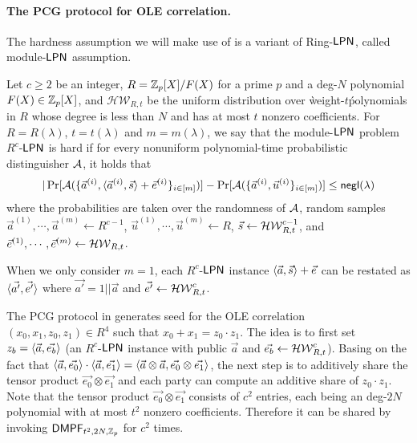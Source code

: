 \paragraph{The PCG protocol for OLE correlation.}The hardness assumption we will make use of is a variant of Ring-${\sf LPN}$, called module-${\sf LPN}$ assumption. 
\begin{definition}\label{def:module-LPN}
    Let $c\ge 2$ be an integer, $R = \mathbb{Z}_p[X]/F(X)$ for a prime $p$ and a deg-$N$ polynomial $F(X)\in \mathbb{Z}_p[X]$, and $\mathcal{HW}_{R,t}$ be the uniform distribution over \`weight-$t$\' polynomials in $R$ whose degree is less than $N$ and has at most $t$ nonzero coefficients. 
     For $R=R(\lambda)$, $t=t(\lambda)$ and $m=m(\lambda)$, we say that the module-${\sf LPN}$ problem $R^c$-${\sf LPN}$ is hard if for every nonuniform polynomial-time probabilistic distinguisher $\mathcal{A}$, it holds that 
    \[
        |\Pr[\mathcal{A}(\{\vec{a}^{(i)}, \langle \vec{a}^{(i)}, \vec{s} \rangle+\vec{e}^{(i)}\}_{i\in [m]})] - \Pr[\mathcal{A}(\{\vec{a}^{(i)},\vec{u}^{(i)}\}_{i\in [m]})] \le \mathsf{negl}(\lambda)
    \]
    where the probabilities are taken over the randomness of $\mathcal{A}$, random samples $\vec{a}^{(1)},\cdots, \vec{a}^{(m)}\leftarrow R^{c-1}$, $\vec{u}^{(1)},\cdots, \vec{u}^{(m)}\leftarrow R$, $\vec{s}\leftarrow \mathcal{HW}_{R,t}^{c-1}$, and $\vec{e}^{(1)},\cdots, \vec{e}^{(m)}\leftarrow \mathcal{HW}_{R,t}$. 

    When we only consider $m=1$, each $R^c$-${\sf LPN}$ instance $ \langle \vec{a}, \vec{s} \rangle+\vec{e}$ can be restated as $\langle \vec{a'}, \vec{e'} \rangle$ where $\vec{a'}=1||\vec{a}$ and $\vec{e'}\leftarrow \mathcal{HW}_{R,t}^c$. 
\end{definition}

The PCG protocol in \cite{cryptoeprint:2022/1035} generates seed for the OLE correlation $(x_0,x_1,z_0,z_1)\in R^4$ such that $x_0+x_1 = z_0\cdot z_1$. The idea is to first set $z_b = \langle \vec{a}, \vec{e_b} \rangle$ (an $R^c$-${\sf LPN}$ instance with public $\vec{a}$ and $\vec{e_b}\leftarrow \mathcal{HW}_{R,t}^c$). Basing on the fact that $\langle \vec{a},  \vec{e_0} \rangle\cdot \langle \vec{a}, \vec{e_1} \rangle = \langle \vec{a}\otimes \vec{a}, \vec{e_0}\otimes \vec{e_1} \rangle$, the next step is to additively share the tensor product $\vec{e_0}\otimes \vec{e_1}$ and each party can compute an additive share of $z_0\cdot z_1$. Note that the tensor product $\vec{e_0}\otimes\vec{e_1}$ consists of $c^2$ entries, each being an deg-$2N$ polynomial with at most $t^2$ nonzero coefficients. Therefore it can be shared by invoking ${\sf DMPF}_{t^2, 2N, \mathbb{Z}_p}$ for $c^2$ times.

